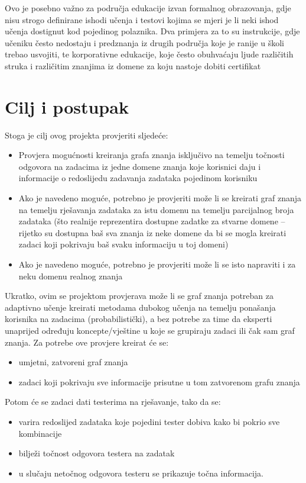 \documentclass[times, utf8,projekt]{fer}
\begin{document}
Ovo je posebno važno za područja edukacije izvan formalnog obrazovanja, gdje nisu strogo definirane ishodi učenja i testovi kojima se mjeri je li neki ishod učenja dostignut kod pojedinog polaznika. Dva primjera za to su instrukcije, gdje učeniku često nedostaju i predznanja iz drugih područja koje je ranije u školi trebao usvojiti, te korporativne edukacije, koje često obuhvaćaju ljude različitih struka i različitim znanjima iz domene za koju nastoje dobiti certifikat


\chapter{Cilj i postupak}
Stoga je cilj ovog projekta provjeriti sljedeće:
\begin{itemize}
\item Provjera mogućnosti kreiranja grafa znanja isključivo na temelju točnosti odgovora na zadacima iz jedne domene znanja koje korisnici daju i informacije o redoslijedu zadavanja zadataka pojedinom korisniku
\item Ako je navedeno moguće, potrebno je provjeriti može li se kreirati graf znanja na temelju rješavanja zadataka za istu domenu na temelju parcijalnog broja zadataka (što realnije reprezentira dostupne zadatke za stvarne domene – rijetko su dostupna baš sva znanja iz neke domene da bi se mogla kreirati zadaci koji pokrivaju baš svaku informaciju u toj domeni)
\item Ako je navedeno moguće, potrebno je provjeriti može li se isto napraviti i za neku domenu realnog znanja\newline
\end{itemize}

Ukratko, ovim se projektom provjerava može li se graf znanja potreban za adaptivno učenje kreirati metodama dubokog učenja na temelju ponašanja korisnika na zadacima (probabilistički), a bez potrebe za time da eksperti unaprijed određuju koncepte/vještine u koje se grupiraju zadaci ili čak sam graf znanja.\newline\newline
Za potrebe ove provjere kreirat će se:
\begin{itemize}
	\item umjetni, zatvoreni graf znanja 
	\item zadaci koji pokrivaju sve informacije prisutne u tom zatvorenom grafu znanja\newline
\end{itemize}
Potom će se zadaci dati testerima na rješavanje, tako da se:
\begin{itemize}
	\item varira redoslijed zadataka koje pojedini tester dobiva kako bi pokrio sve kombinacije
	\item bilježi točnost odgovora testera na zadatak
	\item u slučaju netočnog odgovora testeru se prikazuje točna informacija.
\end{itemize}
\end{document}
